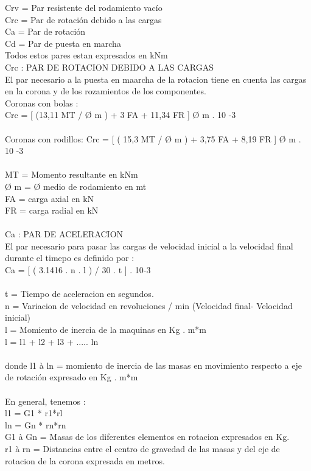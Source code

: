 \documentclass[12pt,a4paper]{article}
\begin{document}
Crv = Par resistente del rodamiento vacío\\
Crc = Par de rotación debido a las cargas\\
Ca = Par de rotación\\
Cd = Par de puesta en marcha\\
Todos estos pares estan expresados en kNm\\
Crc : PAR DE ROTACION DEBIDO A LAS CARGAS\\
El par necesario a la puesta en maarcha de la rotacion tiene en cuenta las cargas en la corona y de los rozamientos de los componentes.\\
Coronas con bolas :\\
Crc = [ (13,11 MT / Ø m ) + 3 FA + 11,34 FR ] Ø m . 10 -3\\\\
Coronas con rodillos:
Crc = [ ( 15,3 MT / Ø m ) + 3,75 FA + 8,19 FR ] Ø m . 10 -3\\\\
MT = Momento resultante en kNm\\
Ø m = Ø medio de rodamiento en mt\\
FA = carga axial en  kN\\
FR = carga radial en kN\\\\
Ca : PAR DE ACELERACION\\
 El par necesario para pasar las cargas de velocidad inicial a la velocidad final durante el timepo es definido por :\\
Ca = [ ( 3.1416 . n . l ) / 30 . t ] . 10-3\\\\
t = Tiempo de aceleracion en segundos.\\
n = Variacion de velocidad en revoluciones / min (Velocidad final- Velocidad inicial)\\
l = Momiento de inercia de la maquinas en Kg . m*m\\
l = l1 + l2 + l3 + ..... ln\\\\
donde l1 à ln = momiento de inercia de las masas en movimiento respecto a eje de rotación expresado en Kg . m*m\\\\
En general, tenemos :\\
l1 = G1 * r1*rl\\
ln = Gn * rn*rn\\
G1 à Gn = Masas de los diferentes elementos en rotacion expresados en Kg.\\
r1 à rn = Distancias entre el centro de gravedad de las masas y del eje de rotacion de la corona expresada en metros.\\\\
\end{document}
